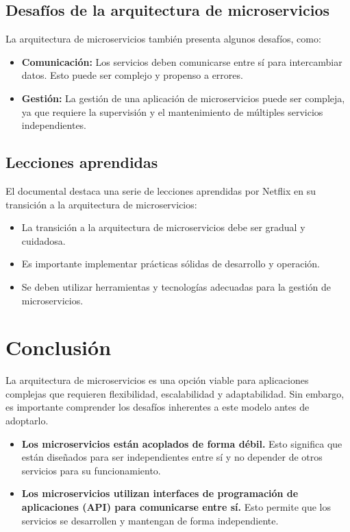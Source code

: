 \documentclass{dense_template}
\begin{document}
\subsection{Desafíos de la arquitectura de microservicios}
La arquitectura de microservicios también presenta algunos desafíos, como:

\begin{itemize}
    \item \textbf{Comunicación:} Los servicios deben comunicarse entre sí para intercambiar datos. Esto puede ser complejo y propenso a errores.
    \item \textbf{Gestión:} La gestión de una aplicación de microservicios puede ser compleja, ya que requiere la supervisión y el mantenimiento de múltiples servicios independientes.
\end{itemize}

\subsection{Lecciones aprendidas}
El documental destaca una serie de lecciones aprendidas por Netflix en su transición a la arquitectura de microservicios:
\begin{itemize}
    \item La transición a la arquitectura de microservicios debe ser gradual y cuidadosa.
    \item Es importante implementar prácticas sólidas de desarrollo y operación.
    \item Se deben utilizar herramientas y tecnologías adecuadas para la gestión de microservicios.
\end{itemize}

\pagebreak
\section{Conclusión}
La arquitectura de microservicios es una opción viable para aplicaciones complejas que requieren flexibilidad, escalabilidad y adaptabilidad. Sin embargo, es importante comprender los desafíos inherentes a este modelo antes de adoptarlo.

\begin{itemize}
    \item \textbf{Los microservicios están acoplados de forma débil.} Esto significa que están diseñados para ser independientes entre sí y no depender de otros servicios para su funcionamiento.
    \item \textbf{Los microservicios utilizan interfaces de programación de aplicaciones (API) para comunicarse entre sí.} Esto permite que los servicios se desarrollen y mantengan de forma independiente.
\end{itemize}
\end{document}
